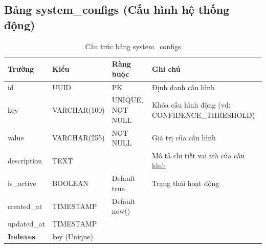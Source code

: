 \documentclass[12pt,a4paper]{article}
\begin{document}
\subsection{Bảng system\_configs (Cấu hình hệ thống động)}
\begin{longtable}{|l|l|l|p{5.5cm}|}
    \caption{Cấu trúc bảng system\_configs}                                                                                    \\
    \hline
    \rowcolor{headerblue}
    \textbf{Trường}  & \textbf{Kiểu}                     & \textbf{Ràng buộc} & \textbf{Ghi chú}                               \\
    \hline
    id               & UUID                              & PK                 & Định danh cấu hình                             \\
    \hline
    key              & VARCHAR(100)                      & UNIQUE, NOT NULL   & Khóa cấu hình động (vd: CONFIDENCE\_THRESHOLD) \\
    \hline
    value            & VARCHAR(255)                      & NOT NULL           & Giá trị của cấu hình                           \\
    \hline
    description      & TEXT                              &                    & Mô tả chi tiết vai trò của cấu hình            \\
    \hline
    is\_active       & BOOLEAN                           & Default true       & Trạng thái hoạt động                           \\
    \hline
    created\_at      & TIMESTAMP                         & Default now()      &                                                \\
    \hline
    updated\_at      & TIMESTAMP                         &                    &                                                \\
    \hline
    \rowcolor{headerblue}
    \textbf{Indexes} & \multicolumn{3}{l|}{key (Unique)}                                                                       \\
    \hline
\end{longtable}
\end{document}
